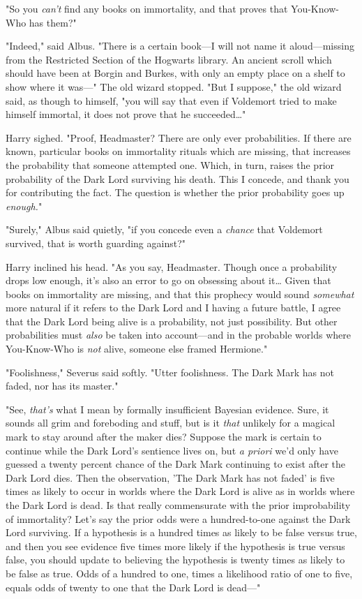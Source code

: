 "So you \emph{can't} find any books on immortality, and that proves that You-Know-Who has them?"

"Indeed," said Albus. "There is a certain book---I will not name it aloud---missing from the Restricted Section of the Hogwarts library. An ancient scroll which should have been at Borgin and Burkes, with only an empty place on a shelf to show where it was---" The old wizard stopped. "But I suppose," the old wizard said, as though to himself, "you will say that even if Voldemort tried to make himself immortal, it does not prove that he succeeded{\ldots}"

Harry sighed. "Proof, Headmaster? There are only ever probabilities. If there are known, particular books on immortality rituals which are missing, that increases the probability that someone attempted one. Which, in turn, raises the prior probability of the Dark Lord surviving his death. This I concede, and thank you for contributing the fact. The question is whether the prior probability goes up \emph{enough.}"

"Surely," Albus said quietly, "if you concede even a \emph{chance} that Voldemort survived, that is worth guarding against?"

Harry inclined his head. "As you say, Headmaster. Though once a probability drops low enough, it's also an error to go on obsessing about it{\ldots} Given that books on immortality are missing, and that this prophecy would sound \emph{somewhat} more natural if it refers to the Dark Lord and I having a future battle, I agree that the Dark Lord being alive is a probability, not just possibility. But other probabilities must \emph{also} be taken into account---and in the probable worlds where You-Know-Who is \emph{not} alive, someone else framed Hermione."

"Foolishness," Severus said softly. "Utter foolishness. The Dark Mark has not faded, nor has its master."

"See, \emph{that's} what I mean by formally insufficient Bayesian evidence. Sure, it sounds all grim and foreboding and stuff, but is it \emph{that} unlikely for a magical mark to stay around after the maker dies? Suppose the mark is certain to continue while the Dark Lord's sentience lives on, but \emph{a priori} we'd only have guessed a twenty percent chance of the Dark Mark continuing to exist after the Dark Lord dies. Then the observation, 'The Dark Mark has not faded' is five times as likely to occur in worlds where the Dark Lord is alive as in worlds where the Dark Lord is dead. Is that really commensurate with the prior improbability of immortality? Let's say the prior odds were a hundred-to-one against the Dark Lord surviving. If a hypothesis is a hundred times as likely to be false versus true, and then you see evidence five times more likely if the hypothesis is true versus false, you should update to believing the hypothesis is twenty times as likely to be false as true. Odds of a hundred to one, times a likelihood ratio of one to five, equals odds of twenty to one that the Dark Lord is dead---"

